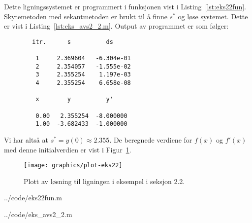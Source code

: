 Dette ligningssystemet er programmert i funksjonen vist i Listing~\ref{lst:eks22fun}. Skytemetoden med sekantmetoden er brukt til å finne $s^*$ og løse systemet. Dette er vist i Listing~\ref{lst:eks_avs2_2.m}. Output av programmet er som følger:

\begin{programoutput}
\begin{verbatim}
        itr.      s          ds

         1     2.369604   -6.304e-01
         2     2.354057   -1.555e-02
         3     2.355254    1.197e-03
         4     2.355254    6.658e-08

         x        y          y'

         0.00   2.355254  -8.000000
         1.00  -3.682433  -1.000000
\end{verbatim}
\end{programoutput}

Vi har altså at $s^* = y(0) \approx 2.355$. De beregnede verdiene for $f(x)$ og $f'(x)$ med denne initialverdien er vist i Figur~\ref{fig:eks22}.
\clearpage

\begin{figure}[htbp]
  \centering
  \texttt{[image: graphics/plot-eks22]}
  \caption{Plott av løsning til ligningen i eksempel i seksjon 2.2.}
  \label{fig:eks22}
\end{figure}


  {../code/eks22fun.m}


  {../code/eks_avs2_2.m}





